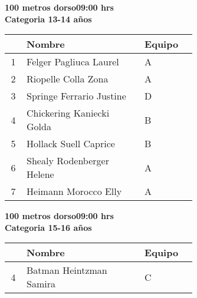 \begin{minipage}{0.95\linewidth}\vspace{0.5cm} 
\begin{flushleft}
\textbf{
\hspace{-0.15cm}100 metros dorso\hspace{1.5cm}09:00 hrs \\Categoria 13-14 años}\vspace{-0.2cm} 
\end{flushleft}
\begin{tabular}{cp{0.63\linewidth}l}
\hline
& \textbf{Nombre} & \textbf{Equipo} \\ \hline
1 & Felger Pagliuca Laurel & A \\ 
2 & Riopelle Colla Zona & A \\ 
3 & Springe Ferrario Justine & D \\ 
4 & Chickering Kaniecki Golda & B \\ 
5 & Hollack Suell Caprice & B \\ 
6 & Shealy Rodenberger Helene & A \\ 
7 & Heimann Morocco Elly & A \\ 
\end{tabular}
\end{minipage}
\begin{minipage}{0.95\linewidth}\vspace{0.5cm} 
\begin{flushleft}
\textbf{
\hspace{-0.15cm}100 metros dorso\hspace{1.5cm}09:00 hrs \\Categoria 15-16 años}\vspace{-0.2cm} 
\end{flushleft}
\begin{tabular}{cp{0.63\linewidth}l}
\hline
& \textbf{Nombre} & \textbf{Equipo} \\ \hline
4 & Batman Heintzman Samira & C \\ 
\end{tabular}
\end{minipage}
